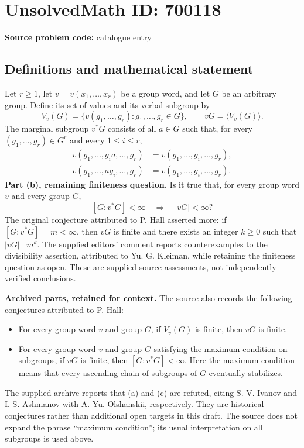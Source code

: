 \documentclass[11pt]{article}
\begin{document}
\section*{UnsolvedMath ID: 700118}
\textbf{Source problem code:} catalogue entry
\subsection{Definitions and mathematical statement}
Let \(r\geq 1\), let \(v=v(x_1,\ldots,x_r)\) be a group word, and let \(G\) be an arbitrary group. Define its set of values and its verbal subgroup by
\[
V_v(G)=\{v(g_1,\ldots,g_r):g_1,\ldots,g_r\in G\},\qquad vG=\langle V_v(G)\rangle.
\]
The marginal subgroup \(v^*G\) consists of all \(a\in G\) such that, for every \((g_1,\ldots,g_r)\in G^r\) and every \(1\leq i\leq r\),
\[
\begin{aligned}
v(g_1,\ldots,g_i a,\ldots,g_r)&=v(g_1,\ldots,g_i,\ldots,g_r),\\
v(g_1,\ldots,a g_i,\ldots,g_r)&=v(g_1,\ldots,g_i,\ldots,g_r).
\end{aligned}
\]
\textbf{Part (b), remaining finiteness question.} Is it true that, for every group word \(v\) and every group \(G\),
\[
[G:v^*G]<\infty\quad\Longrightarrow\quad |vG|<\infty?
\]
The original conjecture attributed to P. Hall asserted more: if \([G:v^*G]=m<\infty\), then \(vG\) is finite and there exists an integer \(k\geq 0\) such that \(|vG|\mid m^k\). The supplied editors' comment reports counterexamples to the divisibility assertion, attributed to Yu. G. Kleiman, while retaining the finiteness question as open. These are supplied source assessments, not independently verified conclusions.

\textbf{Archived parts, retained for context.} The source also records the following conjectures attributed to P. Hall:
\begin{itemize}
\item[(a)] For every group word \(v\) and group \(G\), if \(V_v(G)\) is finite, then \(vG\) is finite.
\item[(c)] For every group word \(v\) and group \(G\) satisfying the maximum condition on subgroups, if \(vG\) is finite, then \([G:v^*G]<\infty\). Here the maximum condition means that every ascending chain of subgroups of \(G\) eventually stabilizes.
\end{itemize}
The supplied archive reports that (a) and (c) are refuted, citing S. V. Ivanov and I. S. Ashmanov with A. Yu. Olshanskii, respectively. They are historical conjectures rather than additional open targets in this draft. The source does not expand the phrase ``maximum condition''; its usual interpretation on all subgroups is used above.
\end{document}

